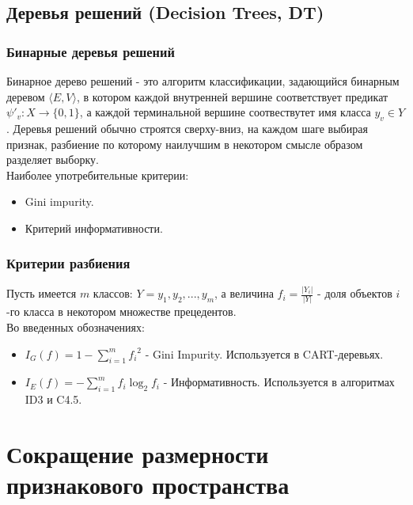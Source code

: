 \documentclass{beamer}
\begin{document}
\subsection{Деревья решений (Decision Trees, DT)}
\begin{frame}
\end{frame}

\begin{frame}
\frametitle{Бинарные деревья решений}
Бинарное дерево решений - это алгоритм классификации, задающийся бинарным деревом $\langle E,V\rangle$, в котором каждой внутренней вершине соответствует предикат $\psi'_v:X\rightarrow\{0,1\}$, а каждой терминальной вершине соотвествутет имя класса $y_v\in Y$.
Деревья решений обычно строятся сверху-вниз, на каждом шаге выбирая признак, разбиение по которому наилучшим в некотором смысле образом разделяет выборку.\newline\\
Наиболее употребительные критерии:
\begin{itemize}
	\item{Gini impurity.}
	\item{Критерий информативности.}
\end{itemize}
\end{frame}

\begin{frame}
\frametitle{Критерии разбиения}
Пусть имеется $m$ классов: $Y={y_1,y_2,...,y_m}$, а величина $f_i=\frac{|Y_i|}{|Y|}$ - доля объектов $i$-го класса в некотором множестве прецедентов.\newline
\\Во введенных обозначениях:
\begin{itemize}
	\item{$I_G(f)=1-\sum\limits_{i=1}^{m}{f_i}^2$ - Gini Impurity. Используется в CART-деревьях.}
	\item{$I_E(f)=-\sum\limits_{i=1}^{m}{f_i}\log_2f_i$ - Информативность. Используется в алгоритмах ID3 и C4.5.}
	
\end{itemize}

\end{frame}

\section{Сокращение размерности признакового пространства}
\begin{frame}
\end{frame}
\end{document}
